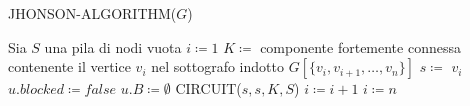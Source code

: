 \begin{algorithm}[H] 
    \caption{JHONSON-ALGORITHM($G$)}\label{alg:jhonson-algorithm}
    \begin{algorithmic}[1]
        \State Sia $S$ una pila di nodi vuota
        \State $i \coloneqq 1$
            \State $K \coloneqq$ componente fortemente connessa contenente il vertice $v_i$
            nel sottografo indotto $G[\{v_i, v_{i+1}, \ldots, v_n\}]$
                \State $s \coloneqq $ $v_i$
                    \State $u.blocked \coloneqq false$
                    \State $u.B \coloneqq \emptyset$
                \EndFor
                \State CIRCUIT($s, s, K, S$)
                \State $i \coloneqq i + 1$
            \Else
                \State $i \coloneqq n$
            \EndIf
        \EndWhile
    \end{algorithmic}
\end{algorithm}